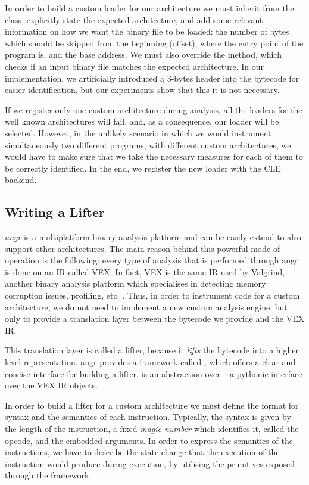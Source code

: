 In order to build a custom loader for our architecture we must inherit from the  class, explicitly state the expected architecture, and add some relevant information on how we want the binary file to be loaded: the number of bytes which should be skipped from the beginning (offset), where the entry point of the program is, and the base address. We must also override the  method, which checks if an input binary file matches the expected architecture. In our implementation, we artificially introduced a 3-bytes header into the bytecode for easier identification, but our experiments show that this it is not necessary. 

If we register only one custom architecture during analysis, all the loaders for the well known architectures will fail, and, as a consequence, our loader will be selected. However, in the unlikely scenario in which we would instrument simultaneously two different programs, with different custom architectures, we would have to make sure that we take the necessary measures for each of them to be correctly identified. In the end, we register the new loader with the \gls{CLE} backend.

\subsection{Writing a Lifter}

\textit{angr} is a multiplatform binary analysis platform and can be easily extend to also support other architectures. The main reason behind this powerful mode of operation is the following: every type of analysis that is performed through angr is done on an \gls{IR} called VEX. In fact, VEX is the same \gls{IR} used by Valgrind, another binary analysis platform which specialises in detecting memory corruption issues, profiling, etc. \cite{valgrind}. Thus, in order to instrument code for a custom architecture, we do not need to implement a new custom analysis engine, but only to provide a translation layer between the bytecode we provide and the VEX \gls{IR}. 

This translation layer is called a lifter, because it \emph{lifts} the bytecode into a higher level representation. angr provides a framework called , which offers a clear and concise interface for building a lifter.  is an abstraction over  -- a pythonic interface over the VEX \gls{IR} objects.

In order to build a lifter for a custom architecture we must define the format for syntax and the semantics of each instruction. Typically, the syntax is given by the length of the instruction, a fixed \emph{magic number} which identifies it, called the opcode, and the embedded arguments. In order to express the semantics of the instructions, we have to describe the state change that the execution of the instruction would produce during execution, by utilising the primitives exposed through the  framework. 

